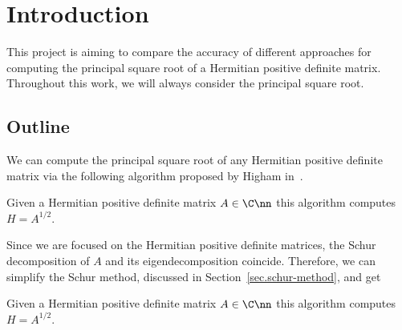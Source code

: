 
\section{Introduction}
\label{sec.introduction}

This project is aiming to compare the accuracy of different approaches for
computing the principal square root of a Hermitian positive definite
matrix.
Throughout this work, we will always consider the principal square root.

\subsection{Outline}

We can compute the principal square root of any Hermitian
positive definite matrix via the following algorithm proposed by Higham
in~.
\begin{algorithm}[h]
\caption{Given a Hermitian positive deﬁnite matrix $A\in \C\nn$ this
  algorithm computes $H = A^{1/2}$.}
\label{alg:sqrt-higham}
\begin{algorithmic}[1]
\end{algorithmic}
\end{algorithm}

Since we are focused on the Hermitian positive definite matrices, the Schur
decomposition of $A$ and its eigendecomposition coincide.
Therefore, we can simplify the Schur method, discussed in
Section~\ref{sec.schur-method}, and get 
\begin{algorithm}[h]
\caption{Given a Hermitian positive deﬁnite matrix $A\in \C\nn$ this
  algorithm computes $H = A^{1/2}$.} 
\label{alg:sqrt-eigdecomp}
\begin{algorithmic}[1]
\end{algorithmic}
\end{algorithm}

